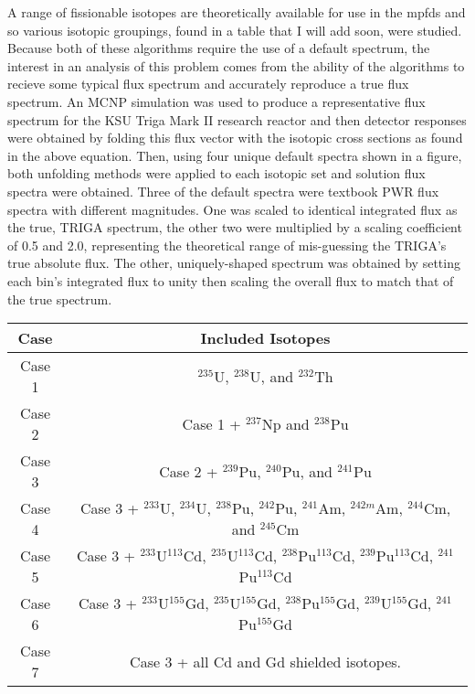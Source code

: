 \documentclass[journal]{IEEEtran}
\begin{document}
A range of fissionable isotopes are theoretically available for use in the mpfds and so various isotopic groupings, found in a table that I will add soon, were studied.
Because both of these algorithms require the use of a default spectrum, the interest in an analysis of this problem comes from the ability of the algorithms to recieve some typical flux spectrum and accurately reproduce a true flux spectrum.
An MCNP simulation was used to produce a representative flux spectrum for the KSU Triga Mark II research reactor and then detector responses were obtained by folding this flux vector with the isotopic cross sections as found in the above equation.
Then, using four unique default spectra shown in a figure, both unfolding methods were applied to each isotopic set and solution flux spectra were obtained.
Three of the default spectra were textbook PWR flux spectra with different magnitudes.
One was scaled to identical integrated flux as the true, TRIGA spectrum, the other two were multiplied by a scaling coefficient of 0.5 and 2.0, representing the theoretical range of mis-guessing the TRIGA's true absolute flux.
The other, uniquely-shaped spectrum was obtained by setting each bin's integrated flux to unity then scaling the overall flux to match that of the true spectrum.

\begin{table*}[h]
\centering
\begin{tabular}{ |c|c| }
 \hline
 \textbf{Case} & \textbf{Included Isotopes} \\
 \hline
 Case 1 & ${}^{235}$U, ${}^{238}$U, and ${}^{232}$Th \\
 \hline
 Case 2 & Case 1 + ${}^{237}$Np and ${}^{238}$Pu \\
 \hline
 Case 3 & Case 2 + ${}^{239}$Pu, ${}^{240}$Pu, and ${}^{241}$Pu \\
 \hline
 Case 4 & Case 3 + ${}^{233}$U, ${}^{234}$U, ${}^{238}$Pu, ${}^{242}$Pu, ${}^{241}$Am, ${}^{242m}$Am, ${}^{244}$Cm, and ${}^{245}$Cm \\
 \hline
 Case 5 & Case 3 + ${}^{233}$U${}^{113}$Cd, ${}^{235}$U${}^{113}$Cd, ${}^{238}$Pu${}^{113}$Cd, ${}^{239}$Pu${}^{113}$Cd, ${}^{241}$Pu${}^{113}$Cd \\
 \hline
 Case 6 & Case 3 + ${}^{233}$U${}^{155}$Gd, ${}^{235}$U${}^{155}$Gd, ${}^{238}$Pu${}^{155}$Gd, ${}^{239}$U${}^{155}$Gd, ${}^{241}$Pu${}^{155}$Gd \\
 \hline
 Case 7 & Case 3 + all Cd and Gd shielded isotopes. \\
 \hline
\end{tabular}
\end{table*}
\end{document}
